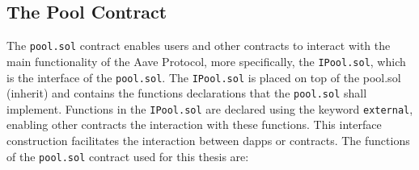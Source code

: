 \documentclass[11pt,a4paper]{report}
\begin{document}
\subsection{The Pool Contract}\label{poolcontract}
The \verb|pool.sol|\cite{poolContract} contract enables users and other contracts to interact with the main functionality of the Aave Protocol, more specifically, the \verb|IPool.sol|, which is the interface of the \verb|pool.sol|. The \verb|IPool.sol| is placed on top of the pool.sol (inherit) and contains the functions declarations that the \verb|pool.sol| shall implement. Functions in the \verb|IPool.sol| are declared using the keyword \verb|external|, enabling other contracts the interaction with these functions. This interface construction facilitates the interaction between dapps or contracts. The functions of the \verb|pool.sol| contract used for this thesis are: 
\end{document}
